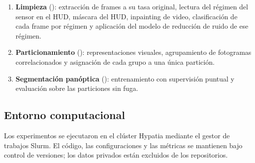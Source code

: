 \begin{enumerate}
    \item \textbf{Limpieza} (): extracción de frames a su tasa original, lectura del régimen del sensor en el HUD, máscara del HUD, inpainting de video, clasificación de cada frame por régimen y aplicación del modelo de reducción de ruido de ese régimen.
    \item \textbf{Particionamiento} (): representaciones visuales, agrupamiento de fotogramas correlacionados y asignación de cada grupo a una única partición.
    \item \textbf{Segmentación panóptica} (): entrenamiento con supervisión puntual y evaluación sobre las particiones sin fuga.
\end{enumerate}

\subsection{Entorno computacional}
Los experimentos se ejecutaron en el clúster Hypatia mediante el gestor de trabajos Slurm. El código, las configuraciones y las métricas se mantienen bajo control de versiones; los datos privados están excluidos de los repositorios.
